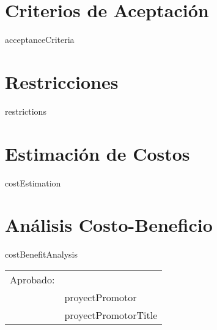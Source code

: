 \documentclass{article}
\begin{document}
    \section{Criterios de Aceptación}
    {{acceptanceCriteria}}

    \section{Restricciones}
    {{restrictions}}

    \section{Estimación de Costos}
    {{costEstimation}}

    \section{Análisis Costo-Beneficio}
    {{costBenefitAnalysis}}

    \vspace{2.5cm}

    \begin{tabular}{@{}p{.5in}p{4in}@{}}
    Aprobado: & \hrulefill \\
    \rowcolor{white} & {{proyectPromotor}} \\
    \rowcolor{white} & {{proyectPromotorTitle}}\\
    \end{tabular}

    
\end{document}
